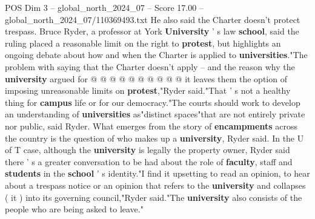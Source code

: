 \begin{textsample}{POS Dim 3 – global\_north\_2024\_07 – Score 17.00 – global\_north\_2024\_07/110369493.txt}
He also said the Charter doesn't protect trespass.
Bruce Ryder, a professor at York \textbf{University} ' s law \textbf{school}, said the ruling placed a reasonable limit on the right to \textbf{protest}, but highlights an ongoing debate about how and when the Charter is applied to \textbf{universities}."The problem with saying that the Charter doesn't apply -- and the reason why the \textbf{university} argued for @ @ @ @ @ @ @ @ @ @ it leaves them the option of imposing unreasonable limits on \textbf{protest},"Ryder said."That ' s not a healthy thing for \textbf{campus} life or for our democracy."The courts should work to develop an understanding of \textbf{universities} as"distinct spaces"that are not entirely private nor public, said Ryder.
What emerges from the story of \textbf{encampments} across the country is the question of who makes up a \textbf{university}, Ryder said.
In the U of T case, although the \textbf{university} is legally the property owner, Ryder said there ' s a greater conversation to be had about the role of \textbf{faculty}, staff and \textbf{students} in the \textbf{school} ' s identity."I find it upsetting to read an opinion, to hear about a trespass notice or an opinion that refers to the \textbf{university} and collapses ( it ) into its governing council,"Ryder said."The \textbf{university} also consists of the people who are being asked to leave."

\end{textsample}
